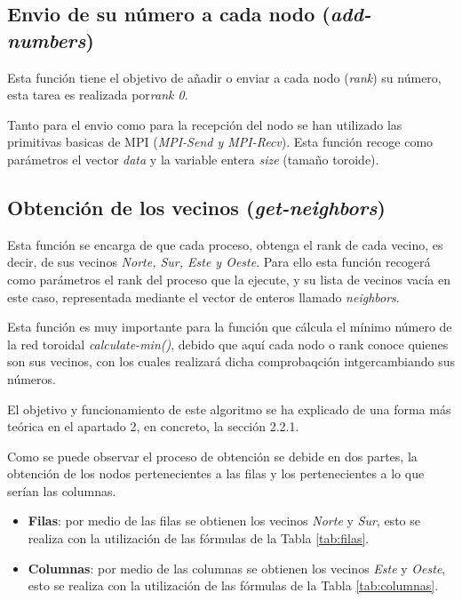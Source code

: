 \documentclass[11pt]{article}
\begin{document}





\subsection{Envio de su número a cada nodo (\textit{add-numbers})}
Esta función tiene el objetivo de añadir o enviar a cada nodo (\textit{rank}) su número, esta tarea es realizada por\textit{rank 0}.

Tanto para el envio como para la recepción del nodo se han utilizado las primitivas basicas de MPI (\textit{MPI-Send y MPI-Recv}).
Esta función recoge como parámetros el vector \textit{data} y la variable entera \textit{size} (tamaño toroide).




\subsection{Obtención de los vecinos (\textit{get-neighbors})}
Esta función se encarga de que cada proceso, obtenga el rank de cada vecino, es decir, de sus vecinos \textit{Norte, Sur, Este y Oeste}. Para ello esta función recogerá como parámetros el rank del proceso que la ejecute, y su lista de vecinos vacía en este caso, representada mediante el vector de enteros llamado \textit{neighbors}.

Esta función es muy importante para la función que cálcula el mínimo número de la red toroidal \textit{calculate-min()}, debido que aquí cada nodo o rank conoce quienes son sus vecinos, con los cuales realizará dicha comprobaqción intgercambiando sus números.

El objetivo y funcionamiento de este algoritmo se ha explicado de una forma más teórica en el apartado 2, en concreto, la sección 2.2.1.



Como se puede observar el proceso de obtención se debide en dos partes, la obtención de los nodos pertenecientes a las filas y los pertenecientes a lo que serían las columnas.

\begin{itemize}
	\item \textbf{Filas}: por medio de las filas se obtienen los vecinos \textit{Norte} y \textit{Sur}, esto se realiza con la utilización de las fórmulas de la Tabla \ref{tab:filas}.
	\item \textbf{Columnas}: por medio de las columnas se obtienen los vecinos \textit{Este} y \textit{Oeste}, esto se realiza con la utilización de las fórmulas de la Tabla \ref{tab:columnas}.
\end{itemize}
\end{document}
